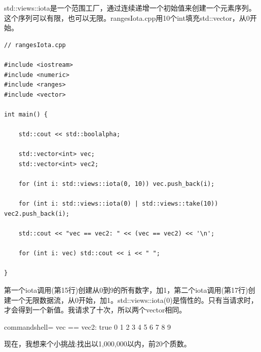 
std::views::iota是一个范围工厂，通过连续递增一个初始值来创建一个元素序列。这个序列可以有限，也可以无限。rangesIota.cpp用10个int填充std::vector，从0开始。

\begin{lstlisting}[style=styleCXX]
// rangesIota.cpp

#include <iostream>
#include <numeric>
#include <ranges>
#include <vector>

int main() {
	
	std::cout << std::boolalpha;
	
	std::vector<int> vec;
	std::vector<int> vec2;
	
	for (int i: std::views::iota(0, 10)) vec.push_back(i);
	
	for (int i: std::views::iota(0) | std::views::take(10)) vec2.push_back(i);
	
	std::cout << "vec == vec2: " << (vec == vec2) << '\n';
	
	for (int i: vec) std::cout << i << " ";

}
\end{lstlisting}

第一个iota调用(第15行)创建从0到9的所有数字，加1，第二个iota调用(第17行)创建一个无限数据流，从0开始，加1。std::views::iota(0)是惰性的。只有当请求时，才会得到一个新值。我请求了十次，所以两个vector相同。

\begin{tcblisting}{commandshell={}}
vec == vec2: true
0 1 2 3 4 5 6 7 8 9
\end{tcblisting}

现在，我想来个小挑战:找出以1,000,000以内，前20个质数。


